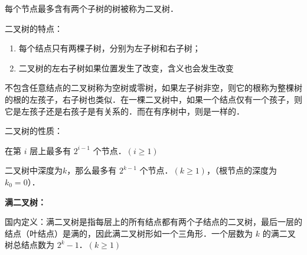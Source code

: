
每个节点最多含有两个子树的树被称为二叉树．

二叉树的特点：

\begin{enumerate}
\item 每个结点只有两棵子树，分别为左子树和右子树；
\item 二叉树的左右子树如果位置发生了改变，含义也会发生改变
\end{enumerate}

不包含任意结点的二叉树称为空树或零树，如果左子树非空，则它的根称为整棵树的根的左孩子，右子树也类似．在一棵二叉树中，如果一个结点仅有一个孩子，则它是左孩子还是右孩子是有关系的．而在有序树中，则是一样的．

二叉树的性质：

在第 $i$ 层上最多有 $2 ^ {i - 1}$ 个节点．$(i\geq1)$

二叉树中深度为$k$，那么最多有 $2 ^ {k - 1}$ 个节点．$(k\geq1)$，（根节点的深度为 $k_0 = 0$）．

\textbf{满二叉树：}

国内定义：满二叉树是指每层上的所有结点都有两个子结点的二叉树，最后一层的结点（叶结点）是满的，因此满二叉树形如一个三角形．一个层数为 $k$ 的满二叉树总结点数为 $2^k - 1$．$(k\geq1)$